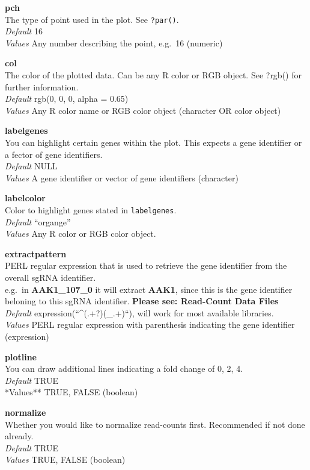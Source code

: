 \documentclass[]{article}
\begin{document}
\textbf{pch}\\
The type of point used in the plot. See \texttt{?par()}.\\
\emph{Default} 16\\
\emph{Values} Any number describing the point, e.g.~16 (numeric)

\textbf{col}\\
The color of the plotted data. Can be any R color or RGB object. See
?rgb() for further information.\\
\emph{Default} rgb(0, 0, 0, alpha = 0.65)\\
\emph{Values} Any R color name or RGB color object (character OR color
object)

\textbf{labelgenes}\\
You can highlight certain genes within the plot. This expects a gene
identifier or a fector of gene identifiers.\\
\emph{Default} NULL\\
\emph{Values} A gene identifier or vector of gene identifiers
(character)

\textbf{labelcolor}\\
Color to highlight genes stated in \texttt{labelgenes}.\\
\emph{Default} ``organge''\\
\emph{Values} Any R color or RGB color object.

\textbf{extractpattern}\\
PERL regular expression that is used to retrieve the gene identifier
from the overall sgRNA identifier.\\
e.g.~in \textbf{AAK1\_107\_0} it will extract \textbf{AAK1}, since this
is the gene identifier beloning to this sgRNA identifier. \textbf{Please
see: Read-Count Data Files}\\
\emph{Default} expression(``\^{}(.+?)(\_.+)``), will work for most
available libraries.\\
\emph{Values} PERL regular expression with parenthesis indicating the
gene identifier (expression)

\textbf{plotline}\\
You can draw additional lines indicating a fold change of 0, 2, 4.\\
\emph{Default} TRUE\\
*Values** TRUE, FALSE (boolean)

\textbf{normalize}\\
Whether you would like to normalize read-counts first. Recommended if
not done already.\\
\emph{Default} TRUE\\
\emph{Values} TRUE, FALSE (boolean)
\end{document}
